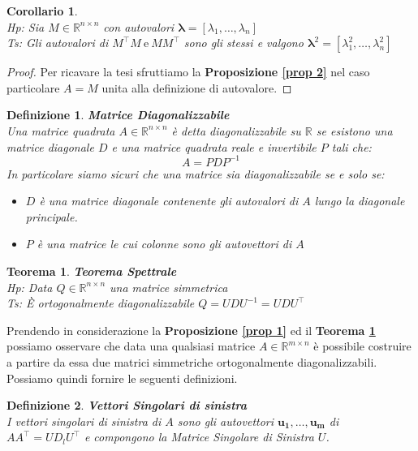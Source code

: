 \documentclass[11pt]{article}
\newtheorem{theorem}{Teorema}
\newtheorem{corollary}{Corollario}
\newtheorem{definition}{Definizione}
\newcommand{\R}{\mathbb{R}}
\begin{document}
\begin{corollary}\label{cor 1}
\textbf{}\\
\textit{Hp:} Sia $M \in \R^{n \times n}$ con autovalori $\mathbf{\lambda}=[\lambda_1, \dots, \lambda_n ]$\\
\textit{Ts:} Gli autovalori di $M^\top      M \ \text{e} \ MM^\top      $ sono gli stessi e valgono $\mathbf{\lambda}^2=[\lambda_1^2, \dots, \lambda_n^2 ]$
\end{corollary}
\begin{proof} Per ricavare la tesi sfruttiamo la \textbf{Proposizione \ref{prop 2}} nel caso particolare $A=M$ unita alla definizione di autovalore.
\end{proof}
\begin{definition} \textbf{Matrice Diagonalizzabile} \\
Una matrice quadrata \(A \in \mathbb{R}^{n \times n}\) è detta diagonalizzabile su \(\R \) se esistono una matrice diagonale \(D\) e una matrice quadrata reale e invertibile \(P\) tali che:
\[
A = P D P^{-1}
\]
In particolare siamo sicuri che una matrice sia diagonalizzabile se e solo se:
\begin{itemize}
\item \(D\) è una matrice diagonale contenente gli autovalori di \(A\) lungo la diagonale principale.
\item \(P\) è una matrice le cui colonne sono gli autovettori di \(A\)
\end{itemize}
\end{definition}
\begin{theorem}\label{teo spetr}
\textbf{Teorema Spettrale}\\
\textit{Hp:} Data $Q\in\mathbb{R}^{n\times n}$ una matrice simmetrica\\
\textit{Ts:} È ortogonalmente diagonalizzabile $Q=UDU^{-1}=UDU^\top$
\end{theorem}
\noindent
Prendendo in considerazione la \textbf{Proposizione \autoref{prop 1}} ed il \textbf{Teorema \ref{teo spetr}} possiamo osservare che data una qualsiasi matrice $A \in \R^{m \times n}$ è possibile costruire a partire da essa due matrici simmetriche ortogonalmente diagonalizzabili. Possiamo quindi fornire le seguenti definizioni.
\begin{definition}
	\textbf{Vettori Singolari di sinistra}\\ I vettori singolari di sinistra di $A$ sono gli autovettori $\mathbf{u_1, \dots ,u_m}$ di $AA^\top  =U  D_lU^\top$ e compongono la \textit{Matrice Singolare di Sinistra} $U$.
\end{definition}
\end{document}
